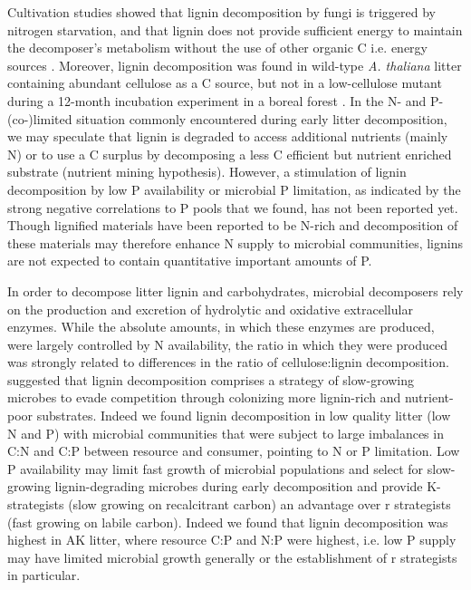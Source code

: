 Cultivation studies showed that lignin decomposition by fungi is triggered by nitrogen starvation, and that lignin does not provide sufficient energy to maintain the decomposer's metabolism without the use of other organic C i.e. energy sources \cite{Janshekar1988}. Moreover, lignin decomposition was found in wild-type \emph{A. thaliana} litter containing abundant cellulose as a C source, but not in a low-cellulose mutant during a 12-month incubation experiment in a boreal forest \cite{Talbot2011}. In the N- and P-(co-)limited situation commonly encountered during early litter decomposition, we may speculate that lignin is degraded to access additional nutrients (mainly N) or to use a C surplus by decomposing a less C efficient but nutrient enriched substrate (nutrient mining hypothesis). However, a stimulation of lignin decomposition by low P availability or microbial P limitation, as indicated by the strong negative correlations to P pools that we found, has not been reported yet. Though lignified materials have been reported to be N-rich and decomposition of these materials may therefore enhance N supply to microbial communities, lignins are not expected to contain quantitative important amounts of P.

In order to decompose litter lignin and carbohydrates, microbial decomposers rely on the production and excretion of hydrolytic and oxidative extracellular enzymes. While the absolute amounts, in which these enzymes are produced, were largely controlled by N availability, the ratio in which they were produced was strongly related to differences in the ratio of cellulose:lignin decomposition. \cite{Talbot2011} suggested that lignin decomposition comprises a strategy of slow-growing microbes to evade competition through colonizing more lignin-rich and nutrient-poor substrates. Indeed we found lignin decomposition in low quality litter (low N and P) with microbial communities that were subject to large imbalances in C:N and C:P between resource and consumer, pointing to N or P limitation. Low P availability may limit fast growth of microbial populations and select for slow-growing lignin-degrading microbes during early decomposition and provide K-strategists (slow growing on recalcitrant carbon) an advantage over r strategists (fast growing on labile carbon). Indeed we found that lignin decomposition was highest in AK litter, where resource C:P and N:P were highest, i.e. low P supply may have limited microbial growth generally or the establishment of r strategists in particular.

